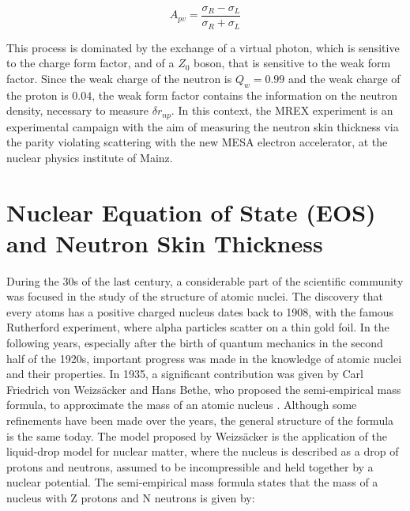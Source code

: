 \begin{equation}
A_{pv} = \dfrac{\sigma_{R} - \sigma_{L}}{\sigma_{R} + \sigma_{L}}
\end{equation}

This process is dominated by the exchange of a virtual photon, which is sensitive to the charge form factor, and of a $Z_{0}$ boson, that is sensitive to the weak form factor. Since the weak charge of the neutron is $Q_{w} = 0.99$ and the weak charge of the proton is $0.04$, the weak form factor contains the information on the neutron density, necessary to measure $\delta r_{np}$. In this context, the MREX experiment is an experimental campaign with the aim of measuring the neutron skin thickness via the parity violating scattering with the new MESA electron accelerator, at the nuclear physics institute of Mainz.

\section{Nuclear Equation of State (EOS) and Neutron Skin Thickness}


During the 30s of the last century, a considerable part of the scientific community was focused in the study of the structure of atomic nuclei. The discovery that every atoms has a positive charged nucleus dates back to 1908, with the famous Rutherford experiment, where alpha particles scatter on a thin gold foil. In the following years, especially after the birth of quantum mechanics in the second half of the 1920s, important progress was made in the knowledge of atomic nuclei and their properties. In 1935, a significant contribution was given by Carl Friedrich von Weizsäcker and Hans Bethe, who proposed the semi-empirical mass formula, to approximate the mass of an atomic nucleus \cite{Bethe:1936zz}. Although some refinements have been made over the years, the general structure of the formula is the same today. 
The model proposed by Weizsäcker is the application of the liquid-drop model for nuclear matter, where the nucleus is described as a drop of protons and neutrons, assumed to be incompressible and held together by a nuclear potential. The semi-empirical mass formula states that the mass of a nucleus with Z protons and N neutrons is given by: 

